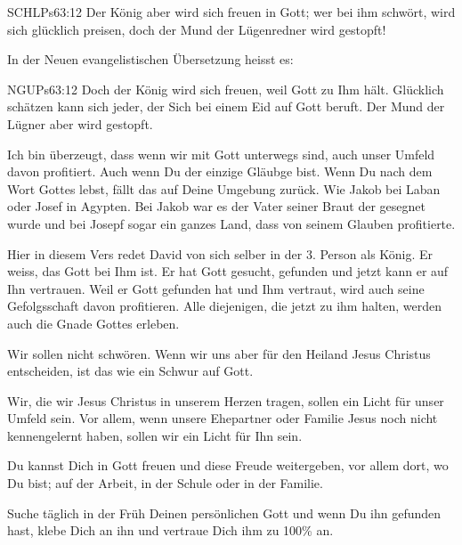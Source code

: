 \documentclass[14pt]{../../inc/mybib}
\begin{document}
\begin{block}
    \begin{bibelbox}{SCHL}{Ps}{63:12}
        Der König aber wird sich freuen in Gott; wer bei ihm schwört, wird sich glücklich preisen, doch der Mund der Lügenredner wird gestopft!
    \end{bibelbox}
    In der Neuen evangelistischen Übersetzung heisst es:
    \begin{bibelbox}{NGU}{Ps}{63:12}
        Doch der König wird sich freuen, weil Gott zu Ihm hält. Glücklich schätzen kann sich jeder, der Sich bei einem Eid auf Gott beruft. Der Mund der Lügner aber wird gestopft.
    \end{bibelbox}
    \begin{block}
        Ich bin überzeugt, dass wenn wir mit Gott unterwegs sind, auch unser Umfeld davon profitiert. Auch wenn Du der einzige Gläubge bist. Wenn Du nach dem Wort Gottes lebst, fällt das auf Deine Umgebung zurück. Wie Jakob bei Laban oder Josef in Agypten. Bei Jakob war es der Vater seiner Braut der gesegnet wurde und bei Josepf sogar ein ganzes Land, dass von seinem Glauben profitierte.

        Hier in diesem Vers redet David von sich selber in der 3. Person als König. Er weiss, das Gott bei Ihm ist. Er hat Gott gesucht, gefunden und jetzt kann er auf Ihn vertrauen. Weil er Gott gefunden hat und Ihm vertraut, wird auch seine Gefolgsschaft davon profitieren. Alle diejenigen, die jetzt zu ihm halten, werden auch die Gnade Gottes erleben.

        Wir sollen nicht schwören. Wenn wir uns aber für den Heiland Jesus Christus entscheiden, ist das wie ein Schwur auf Gott.
    \end{block}
    \begin{block}
        Wir, die wir Jesus Christus in unserem Herzen tragen, sollen ein Licht für unser Umfeld sein. Vor allem, wenn unsere Ehepartner oder Familie Jesus noch nicht kennengelernt haben, sollen wir ein Licht für Ihn sein.     

        Du kannst Dich in Gott freuen und diese Freude weitergeben, vor allem dort, wo Du bist; auf der Arbeit, in der Schule oder in der Familie.
\end{block}
    Suche täglich in der Früh Deinen persönlichen Gott und wenn Du ihn gefunden hast, klebe Dich an ihn und vertraue Dich ihm zu 100\% an.\\
    \\
    \beten
\end{block}  
\end{document}
